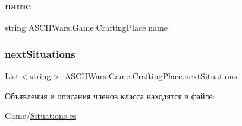 \subsubsection{\texorpdfstring{name}{name}}
{\footnotesize\ttfamily string A\+S\+C\+I\+I\+Wars.\+Game.\+Crafting\+Place.\+name}

\hypertarget{class_a_s_c_i_i_wars_1_1_game_1_1_crafting_place_a29294bd0619212b716e258dce38c89dc}{}\label{class_a_s_c_i_i_wars_1_1_game_1_1_crafting_place_a29294bd0619212b716e258dce38c89dc} 
\subsubsection{\texorpdfstring{next\+Situations}{nextSituations}}
{\footnotesize\ttfamily List$<$string$>$ A\+S\+C\+I\+I\+Wars.\+Game.\+Crafting\+Place.\+next\+Situations}



Объявления и описания членов класса находятся в файле\+:\begin{DoxyCompactItemize}
\item 
Game/\hyperlink{_situations_8cs}{Situations.\+cs}\end{DoxyCompactItemize}
